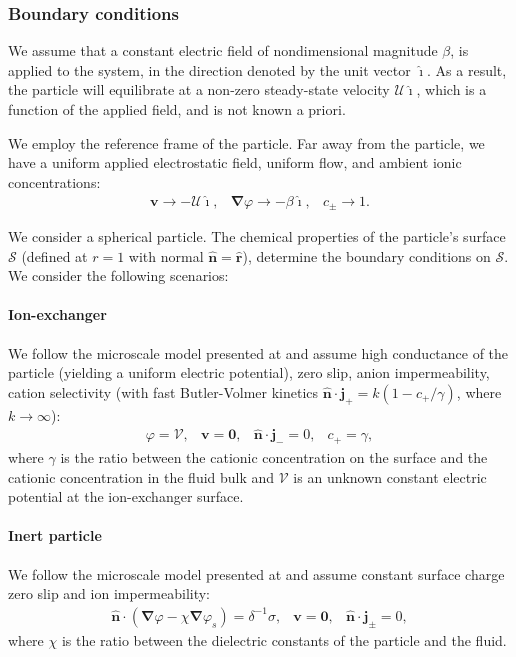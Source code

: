 \documentclass[preprint,10pt]{elsarticle}
\newcommand\bnabla{\boldsymbol{\nabla}}
\newcommand\bv{\boldsymbol{v}}
\newcommand\bn{\boldsymbol{\hat{n}}}
\newcommand\bj{\boldsymbol{j}}
\newcommand\br{\boldsymbol{r}}
\newcommand\brhat{\hat{\br}}
\newcommand\bzero{\boldsymbol{0}}
\newcommand\cU{\mathscr{U}}
\newcommand\cV{\mathscr{V}}
\newcommand\ui{\boldsymbol{\hat{\imath}}}
\begin{document}
\subsubsection{Boundary conditions}
We assume that a constant electric field of nondimensional magnitude $\beta$,
is applied to the system, in the direction denoted by the unit vector $\ui$.
As a result, the particle will equilibrate at 
a non-zero steady-state velocity $\cU \ui$, which is
a function of the applied field, and is not known a priori.

We employ the reference frame of the particle.
Far away from the particle, we have a uniform applied electrostatic field, uniform flow,
and ambient ionic concentrations:
\begin{equation}\label{eq:bndcond_inf}\begin{array}{ccc}
\bv \rightarrow -\cU \ui, &
\bnabla \varphi \rightarrow -\beta\ui, &
 c_\pm \rightarrow 1.
\end{array}\end{equation}

We consider a spherical particle.
The chemical properties of the particle's surface $\mathcal{S}$ (defined at $r=1$ 
with normal $\bn = \brhat$), determine the boundary conditions on $\mathcal{S}$.
We consider the following scenarios:
\paragraph{Ion-exchanger}
We follow the microscale model presented at \cite{yariv2010migration}
and assume high conductance of the particle (yielding a uniform electric potential),
zero slip, anion impermeability, cation selectivity 
(with fast Butler-Volmer\cite{bard2000book} kinetics
$\bn \cdot \bj_+ = k (1 - c_+/\gamma)$, where $k \rightarrow \infty$):
\begin{equation}
\begin{array}{cccc}
\varphi = \cV, &
\bv = \bzero, &
\bn \cdot \bj_- = 0, &
c_+ = \gamma,
\end{array}
\end{equation}
where $\gamma$ is the ratio between the cationic concentration on the surface and the cationic
concentration in the fluid bulk and $\cV$ is an unknown constant electric potential at
the ion-exchanger surface. 

\paragraph{Inert particle}
We follow the microscale model presented at \cite{schnitzer2012surface}
and assume constant surface charge
zero slip and ion impermeability:
\begin{equation}
\begin{array}{cccc}
\bn \cdot (\bnabla \varphi - \chi \bnabla \varphi_s) = \delta^{-1} \sigma, &
\bv = \bzero, &
\bn \cdot \bj_\pm = 0,
\end{array}
\end{equation}
where $\chi$ is the ratio between the dielectric constants of the 
particle and the fluid.
\end{document}
